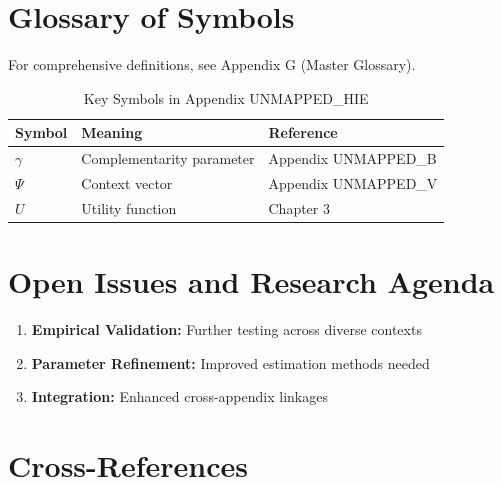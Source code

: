\section{Glossary of Symbols}
\label{sec:hie-glossary}

For comprehensive definitions, see Appendix G (Master Glossary).

\begin{table}[htbp]
\centering
\caption{Key Symbols in Appendix UNMAPPED_HIE}
\begin{tabular}{lll}
\toprule
\textbf{Symbol} & \textbf{Meaning} & \textbf{Reference} \\
\midrule
$\gamma$ & Complementarity parameter & Appendix UNMAPPED_B \\
$\Psi$ & Context vector & Appendix UNMAPPED_V \\
$U$ & Utility function & Chapter 3 \\
\bottomrule
\end{tabular}
\end{table}



\section{Open Issues and Research Agenda}
\label{sec:hie-open}

\begin{enumerate}
    \item \textbf{Empirical Validation:} Further testing across diverse contexts
    \item \textbf{Parameter Refinement:} Improved estimation methods needed
    \item \textbf{Integration:} Enhanced cross-appendix linkages
\end{enumerate}

\section{Cross-References}

\nocite{bcm_master}

\label{sec:hie-crossref}

